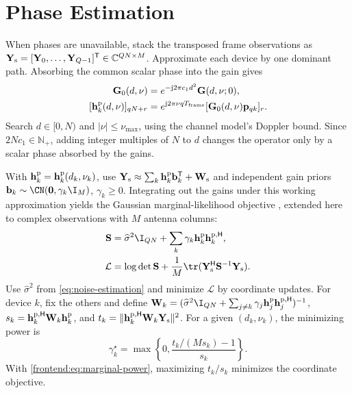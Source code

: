 \section{Phase Estimation}
\label{app:frontend}
\label{app:phase-estimation}

When phases are unavailable, stack the transposed frame observations as
$\mathbf Y_{\rm s}=[\mathbf Y_0,\ldots,\mathbf Y_{Q-1}]^{\mathsf T}
\in\mathbb C^{QN\times M}$. Approximate each device by one dominant path.
Absorbing the common scalar phase
into the gain gives
\begin{equation}
 \begin{aligned}
 \mathbf G_0(d,\nu)&=e^{-\mathrm j2\pi c_1d^2}\mathbf G(d,\nu;0),\\
 [\mathbf h_k^{\rm p}(d,\nu)]_{qN+r}
 &=e^{\mathrm j2\pi\nu qT_{\rm frame}}
 [\mathbf G_0(d,\nu)\mathbf p_{qk}]_r.
 \end{aligned}
 \label{frontend:eq:phase-atom}
\end{equation}
Search $d\in[0,N)$ and $|\nu|\leq\nu_{\max}$, using the channel model's
Doppler bound. Since $2Nc_1\in\mathbb N_+$,
adding integer multiples of $N$ to $d$ changes the operator only by a
scalar phase absorbed by the gains.

With $\mathbf h_k^{\rm p}=\mathbf h_k^{\rm p}(d_k,\nu_k)$, use
$\mathbf Y_{\rm s}\approx\sum_k\mathbf h_k^{\rm p}\mathbf b_k^{\mathsf T}
+\mathbf W_{\rm s}$ and independent gain priors
$\mathbf b_k\sim\CN(\mathbf0,\gamma_k\I_M)$, $\gamma_k\geq0$.
Integrating out the gains under this working approximation yields
the Gaussian marginal-likelihood objective
\cite[Sec.~2.1]{tipping2003}, extended here to complex observations with
$M$ antenna columns:
\begin{equation}
 \begin{aligned}
 \mathbf S&=\widehat\sigma^2\I_{QN}
 +\sum_k\gamma_k\mathbf h_k^{\rm p}\mathbf h_k^{{\rm p},\mathsf H},\\
 \mathcal L&=\log\det\mathbf S+
 \frac1M\tr(\mathbf Y_{\rm s}^{\mathsf H}\mathbf S^{-1}\mathbf Y_{\rm s}).
 \end{aligned}
 \label{frontend:eq:marginal-objective}
\end{equation}
Use $\widehat\sigma^2$ from \eqref{eq:noise-estimation} and minimize
$\mathcal L$ by coordinate updates. For device $k$, fix the others and define
$\mathbf W_k=(\widehat\sigma^2\I_{QN}
+\sum_{j\ne k}\gamma_j\mathbf h_j^{\rm p}\mathbf h_j^{{\rm p},\mathsf H})^{-1}$,
$s_k=\mathbf h_k^{{\rm p},\mathsf H}\mathbf W_k\mathbf h_k^{\rm p}$, and
$t_k=\|\mathbf h_k^{{\rm p},\mathsf H}\mathbf W_k\mathbf Y_{\rm s}\|^2$.
For a given $(d_k,\nu_k)$, the minimizing power is
\begin{equation}
 \gamma_k^\star=\max\left\{0,\frac{t_k/(Ms_k)-1}{s_k}\right\}.
 \label{frontend:eq:marginal-power}
\end{equation}
With \eqref{frontend:eq:marginal-power}, maximizing $t_k/s_k$ minimizes
the coordinate objective.

